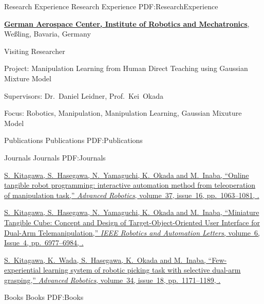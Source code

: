 \documentclass[letterpaper,MMMyyyy,nonstopmode]{simpleresumecv}
\begin{document}
\begin{Body}

\Section
{Research Experience}
{Research Experience}
{PDF:ResearchExperience}

\Gap
\Entry
\href{https://www.dlr.de/EN/Home/home_node.html}
{\textbf{German Aerospace Center, Institute of Robotics and Mechatronics}},
Weßling, Bavaria, Germany 
\Gap

\Gap
Visiting Researcher
\hfill
{}
\begin{Detail}
\par
Project:
Manipulation Learning from Human Direct Teaching using Gaussian Mixture Model
\par
Supervisors:
Dr.~Daniel Leidner,
Prof.~Kei~Okada
\par
Focus:
Robotics, Manipulation, Manipulation Learning, Gaussian Mixuture Model
\end{Detail}
\Gap


\Section
{Publications}
{Publications}
{PDF:Publications}

\SubSection
{Journals}
{Journals}
{PDF:Journals}

\begingroup

\BulletItem
\href{https://doi.org/10.1080/01691864.2023.2239316}
{\underline{S.~Kitagawa}, S.~Hasegawa, N.~Yamaguchi, K.~Okada and M.~Inaba,
``Online tangible robot programming: interactive automation method from teleoperation of manipulation task,''
\textit{Advanced Robotics},
volume~37,
issue~16,
pp.~1063--1081,
.}

\Gap
\BulletItem
\href{https://doi.org/10.1109/LRA.2021.3096475}
{\underline{S.~Kitagawa}, S.~Hasegawa, N.~Yamaguchi, K.~Okada and M.~Inaba,
``Miniature Tangible Cube: Concept and Design of Target-Object-Oriented User Interface for Dual-Arm Telemanipulation,''
\textit{IEEE Robotics and Automation Letters},
volume~6,
Issue~4,
pp.~6977--6984,
.}

\Gap
\BulletItem
\href{https://doi.org/10.1080/01691864.2020.1783352}
{\underline{S.~Kitagawa}, K.~Wada, S.~Hasegawa, K.~Okada and M.~Inaba,
``Few-experiential learning system of robotic picking task with selective dual-arm grasping,''
\textit{Advanced Robotics},
volume~34,
issue~18,
pp.~1171--1189,
.}

\endgroup

\BigGap
\SubSection
{Books}
{Books}
{PDF:Books}


\end{Body}
\end{document}
